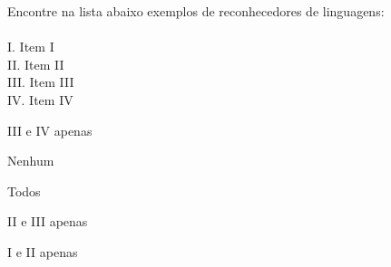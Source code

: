 \question[10]
Encontre na lista abaixo exemplos de reconhecedores de linguagens:\\
\\
I. Item I\\
II. Item II\\
III. Item III\\
IV. Item IV
\\
\begin{choices}
\item III e IV apenas
\item Nenhum %
\item Todos
\item II e III apenas
\item I e II apenas
\end{choices}
\answerline

